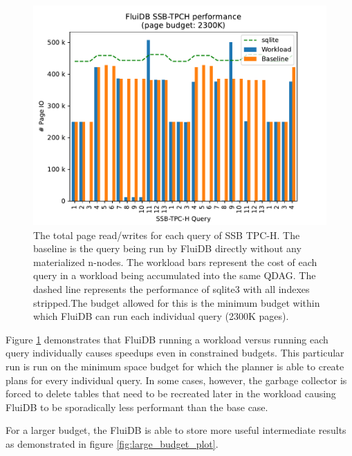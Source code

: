 \newcommand{\ioperfdescr}{The total page read/writes for each query of
  SSB TPC-H. The baseline is the query being run by FluiDB directly
  without any materialized n-nodes. The workload bars represent the
  cost of each query in a workload being accumulated into the same
  QDAG. The dashed line represents the performance of sqlite3 with all
  indexes stripped.}
\begin{figure}[H]
\centering
\includegraphics[width=.9\linewidth]{./plans/workload_2300K.pdf}
\caption{\label{fig:min_budget_plot} \ioperfdescr The budget allowed
  for this is the minimum budget within which FluiDB can run each
  individual query (2300K pages).}
\end{figure}

Figure \ref{fig:min_budget_plot} demonstrates that FluiDB running a
workload versus running each query individually causes speedups even
in constrained budgets. This particular run is run on the minimum
space budget for which the planner is able to create plans for every
individual query. In some cases, however, the garbage collector is
forced to delete tables that need to be recreated later in the
workload causing FluiDB to be sporadically less performant than the
base case.

For a larger budget, the FluiDB is able to store more useful
intermediate results as demonstrated in figure
\ref{fig:large_budget_plot}.

